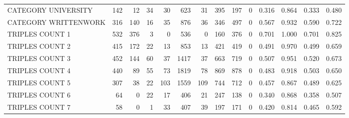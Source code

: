 \begin{tabular}{lrrrrrrrrrllll}
 CATEGORY UNIVERSITY      &             142 &            12 &              34 &              30 &             623 &   31 &  395 &  197 &    0 & 0.316 & 0.864 & 0.333 & 0.480 \\
 CATEGORY WRITTENWORK     &             316 &           140 &              16 &              35 &             876 &   36 &  346 &  497 &    0 & 0.567 & 0.932 & 0.590 & 0.722 \\
 TRIPLES COUNT 1          &             532 &           376 &               3 &               0 &             536 &    0 &  160 &  376 &    0 & 0.701 & 1.000 & 0.701 & 0.825 \\
 TRIPLES COUNT 2          &             415 &           172 &              22 &              13 &             853 &   13 &  421 &  419 &    0 & 0.491 & 0.970 & 0.499 & 0.659 \\
 TRIPLES COUNT 3          &             452 &           144 &              60 &              37 &            1417 &   37 &  663 &  719 &    0 & 0.507 & 0.951 & 0.520 & 0.673 \\
 TRIPLES COUNT 4          &             440 &            89 &              55 &              73 &            1819 &   78 &  869 &  878 &    0 & 0.483 & 0.918 & 0.503 & 0.650 \\
 TRIPLES COUNT 5          &             307 &            38 &              22 &             103 &            1559 &  109 &  744 &  712 &    0 & 0.457 & 0.867 & 0.489 & 0.625 \\
 TRIPLES COUNT 6          &              64 &             0 &              22 &              17 &             406 &   21 &  247 &  138 &    0 & 0.340 & 0.868 & 0.358 & 0.507 \\
 TRIPLES COUNT 7          &              58 &             0 &               1 &              33 &             407 &   39 &  197 &  171 &    0 & 0.420 & 0.814 & 0.465 & 0.592 \\
\hline
\end{tabular}